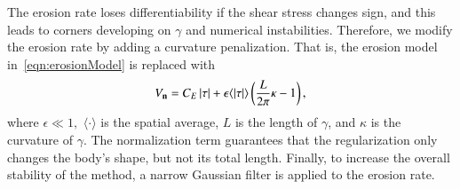\documentclass[preprint, 10pt]{elsarticle}
\begin{document}
The erosion rate loses differentiability if the shear stress changes
sign, and this leads to corners developing on $\gamma$ and numerical
instabilities.  Therefore, we modify the erosion rate by adding a
curvature penalization. That is, the erosion model
in~\eqref{eqn:erosionModel} is replaced with 
\begin{align}
  V_{\mathbf{n}} = C_E \, \lvert \tau \rvert + \epsilon \langle\lvert \tau \rvert\rangle \left(
    \frac{L}{2\pi} \kappa - 1 \right),
\end{align}
where $\epsilon \ll 1,$ $\langle \cdot \rangle$ is the spatial average,
$L$ is the length of $\gamma$, and $\kappa$ is the curvature of
$\gamma$.  The normalization term guarantees that the regularization
only changes the body's shape, but not its total length.  Finally, to
increase the overall stability of the method, a narrow Gaussian filter
is applied to the erosion rate.

\end{document}
